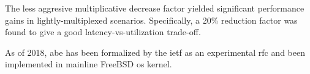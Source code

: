 The less aggresive multiplicative decrease factor yielded  significant performance gains in lightly-multiplexed scenarios. Specifically, a 20\% reduction factor was found to give a good latency-vs-utilization trade-off.

As of 2018, \gls{abe} has been formalized by the \gls{ietf} as an experimental \gls{rfc} \cite{rfc8511} and been implemented in mainline FreeBSD \gls{os} kernel.

